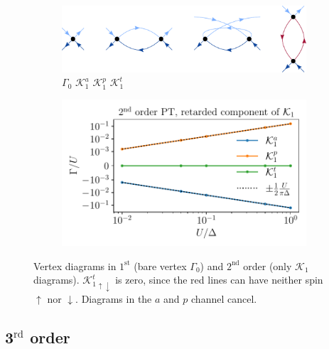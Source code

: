 \documentclass[10pt]{scrartcl}
\newcommand{\Ktot}[1]{\mathcal{K}_#1}
\newcommand{\K}[2]{\mathcal{K}_#1^#2}
\newcommand{\updown}{_{\uparrow\downarrow}}
\begin{document}
\begin{figure}[h!]
\begin{subfigure}[c]{0.4\textwidth}
\includegraphics[scale=0.3]{diagrams/PT2}
\\
$\Gamma_0$ \hspace{0.75cm} $\K1a$ \hspace{1.1cm} $\K1p$ \hspace{0.7cm} $\K1t$
\end{subfigure}
\begin{subfigure}[c]{0.4\textwidth}
\includegraphics[scale=0.65]{plots/PT2}
\end{subfigure}
\caption{Vertex diagrams in $1^\text{st}$ (bare vertex $\Gamma_0$) and $2^\text{nd}$ order (only $\Ktot1$ diagrams). ${\K1t}\updown$ is zero, since the red lines can have neither spin $\uparrow$ nor $\downarrow$. Diagrams in the $a$ and $p$ channel cancel.}
\end{figure}

\newpage

\subsection*{3$^\text{rd}$ order}

\vspace{-0.5cm}
\end{document}
